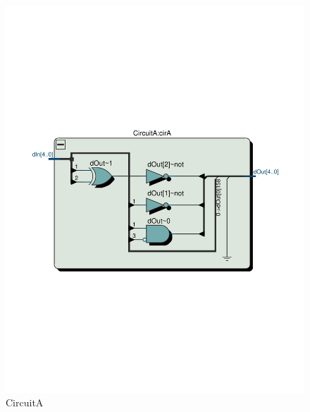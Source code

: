 \documentclass[13pt,a4paper]{report}
\begin{document}
\begin{figure}[H]
\centering
\includegraphics[scale=0.5, clip, trim={0cm 8.5cm 0cm 9.5cm}]{images/Exc2_CircuitA_RTL.pdf}
\caption*{CircuitA}
\end{figure}
\end{document}
